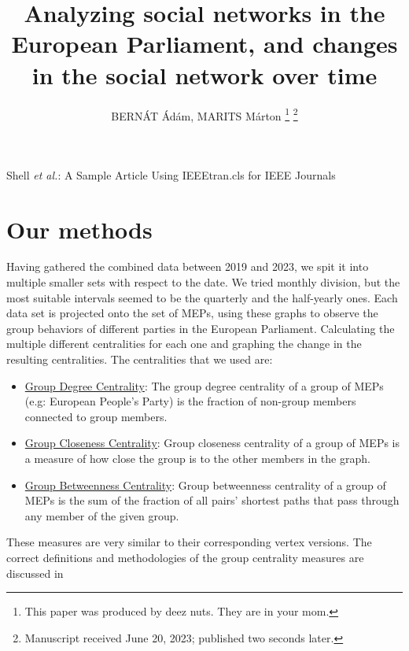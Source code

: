 \documentclass[lettersize,journal]{IEEEtran}
\begin{document}
\title{Analyzing social networks in the European Parliament, and changes in the social network over time}

\author{{BERNÁT Ádám, MARITS Márton}
\thanks{This paper was produced by deez nuts. They are in your mom.}%
\thanks{Manuscript received June 20, 2023; published two seconds later.}}

%
{Shell \MakeLowercase{\textit{et al.}}: A Sample Article Using IEEEtran.cls for IEEE Journals}


\maketitle

\section{Our methods} \label{sec:method}
Having gathered the combined data between 2019 and 2023, we spit it into multiple smaller sets with respect to the date. We tried monthly division, but the most suitable intervals seemed to be the quarterly and the half-yearly ones. Each data set is projected onto the set of  MEPs, using these graphs to observe the group behaviors of different parties in the European Parliament. Calculating the multiple different centralities for each one and graphing the change in the resulting centralities. The centralities that we used are:

\begin{itemize}
\item \underline{Group Degree Centrality}: The group degree centrality of a group of MEPs (e.g: European People's Party) is the fraction of non-group members connected to group members.
\item \underline{Group Closeness Centrality}: Group closeness centrality of a group of MEPs is a measure of how close the group is to the other members in the graph.
\item \underline{Group Betweenness Centrality}: Group betweenness centrality of a group of MEPs is the sum of the fraction of all pairs' shortest paths that pass through any member of the given group.
\end{itemize}
These measures are very similar to their corresponding vertex versions. The correct definitions and methodologies of the group centrality measures are discussed in \cite{Centralities}
\end{document}
